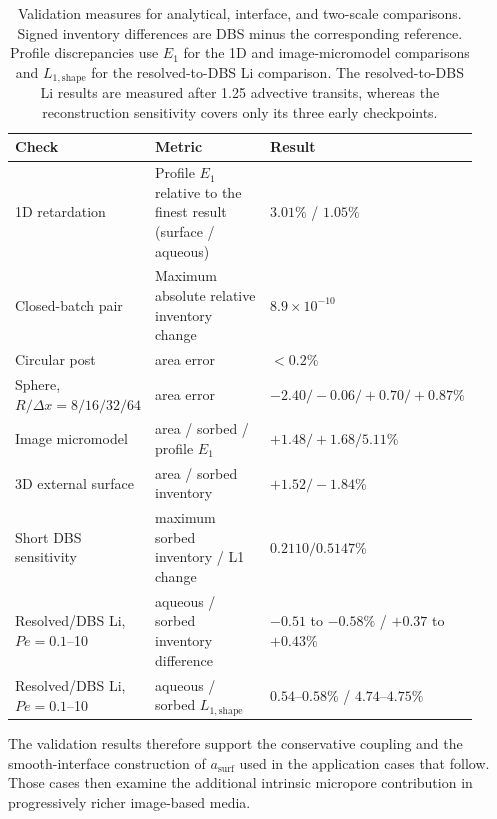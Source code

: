 \begin{table}[htbp]
    \centering
    \caption{Validation measures for analytical, interface, and two-scale
    comparisons. Signed inventory differences are DBS minus the corresponding
    reference. Profile discrepancies use $E_1$ for the 1D and image-micromodel
    comparisons and $L_{1,\mathrm{shape}}$ for the resolved-to-DBS Li comparison. The resolved-to-DBS Li results
    are measured after 1.25 advective transits, whereas the reconstruction
    sensitivity covers only its three early checkpoints.}
    \label{tab:validationSummary}
    \footnotesize
    \setlength{\tabcolsep}{3pt}
    \begin{tabular}{@{}p{0.27\linewidth}p{0.43\linewidth}p{0.22\linewidth}@{}}
        \toprule
        Check & Metric & Result \\
        \midrule
        1D retardation & Profile $E_1$ relative to the finest result (surface / aqueous) & $3.01\%$ / $1.05\%$ \\
        Closed-batch pair & Maximum absolute relative inventory change & $8.9\times10^{-10}$ \\
        Circular post & area error & $<0.2\%$ \\
        Sphere, $R/\Delta x=8/16/32/64$ & area error & $-2.40/-0.06/+0.70/+0.87\%$ \\
        Image micromodel & area / sorbed / profile $E_1$ & $+1.48/+1.68/5.11\%$ \\
        3D external surface & area / sorbed inventory & $+1.52/-1.84\%$ \\
        Short DBS sensitivity & maximum sorbed inventory / L1 change & $0.2110/0.5147\%$ \\
        Resolved/DBS Li, $Pe=0.1$--10 & aqueous / sorbed inventory difference & $-0.51$ to $-0.58\%$ / $+0.37$ to $+0.43\%$ \\
        Resolved/DBS Li, $Pe=0.1$--10 & aqueous / sorbed $L_{1,\mathrm{shape}}$ & $0.54$--$0.58\%$ / $4.74$--$4.75\%$ \\
        \bottomrule
    \end{tabular}
\end{table}

The validation results therefore support the conservative coupling
and the smooth-interface construction of $a_{\mathrm{surf}}$ used in the
application cases that follow. Those cases then examine the additional
intrinsic micropore contribution in progressively richer image-based media.
